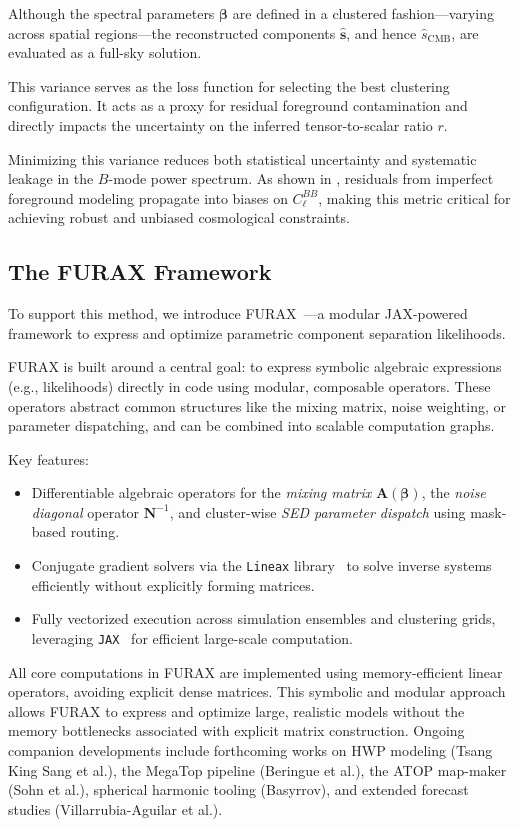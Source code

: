 \documentclass[%
 reprint,
bibnotes,
 amsmath,amssymb,
 aps,
floatfix, 
]{revtex4-2}
\begin{document}
Although the spectral parameters \( \boldsymbol{\beta} \) are defined in a clustered fashion—varying across spatial regions—the reconstructed components \( \hat{\mathbf{s}} \), and hence \( \hat{s}_{\mathrm{CMB}} \), are evaluated as a full-sky solution.

This variance serves as the loss function for selecting the best clustering configuration. It acts as a proxy for residual foreground contamination and directly impacts the uncertainty on the inferred tensor-to-scalar ratio \( r \).

Minimizing this variance reduces both statistical uncertainty and systematic leakage in the \( B \)-mode power spectrum. As shown in \citep{Errard2015}, residuals from imperfect foreground modeling propagate into biases on \( C_\ell^{BB} \), making this metric critical for achieving robust and unbiased cosmological constraints.

\subsection{The FURAX Framework}

To support this method, we introduce \textsc{FURAX}~\citep{FURAX}---a modular JAX-powered framework to express and optimize parametric component separation likelihoods.

FURAX is built around a central goal: to express symbolic algebraic expressions (e.g., likelihoods) directly in code using modular, composable operators. These operators abstract common structures like the mixing matrix, noise weighting, or parameter dispatching, and can be combined into scalable computation graphs.

Key features:
\begin{itemize}
    \item Differentiable algebraic operators for the \textit{mixing matrix} \( \mathbf{A}(\boldsymbol{\beta}) \), the \textit{noise diagonal} operator \( \mathbf{N}^{-1} \), and cluster-wise \textit{SED parameter dispatch} using mask-based routing.
    \item Conjugate gradient solvers via the \texttt{Lineax} library~\citep{lineax} to solve inverse systems efficiently without explicitly forming matrices.
    \item Fully vectorized execution across simulation ensembles and clustering grids, leveraging \texttt{JAX}~\citep{JAX} for efficient large-scale computation.
\end{itemize}

All core computations in FURAX are implemented using memory-efficient linear operators, avoiding explicit dense matrices. This symbolic and modular approach allows FURAX to express and optimize large, realistic models without the memory bottlenecks associated with explicit matrix construction. Ongoing companion developments include forthcoming works on HWP modeling (Tsang King Sang et al.), the MegaTop pipeline (Beringue et al.), the ATOP map-maker (Sohn et al.), spherical harmonic tooling (Basyrrov), and extended forecast studies (Villarrubia-Aguilar et al.).
\end{document}

